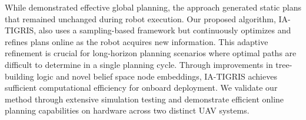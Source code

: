 While \cite{moon2022tigris} demonstrated effective global planning, the approach generated static plans that remained unchanged during robot execution. Our proposed algorithm, IA-TIGRIS, also uses a sampling-based framework but continuously optimizes and refines plans online as the robot acquires new information. This adaptive refinement is crucial for long-horizon planning scenarios where optimal paths are difficult to determine in a single planning cycle. Through improvements in tree-building logic and novel belief space node embeddings, IA-TIGRIS achieves sufficient computational efficiency for onboard deployment. We validate our method through extensive simulation testing and demonstrate efficient online planning capabilities on hardware across two distinct UAV systems.



